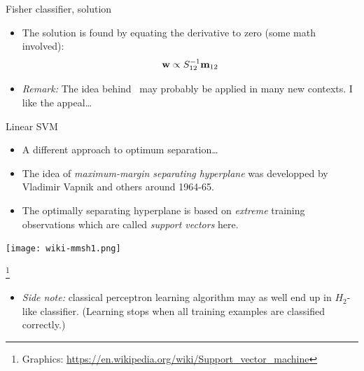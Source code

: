 \documentclass[handout]{beamer}   %
\def\S{S}
\def\b#1{{\bf #1}}
\newcommand\blfootnote[1]{%
  \begingroup
  \renewcommand\thefootnote{}\footnote{#1}%
  \addtocounter{footnote}{-1}%
  \endgroup
}
\newcommand\graphics[1]{%
  \blfootnote{\hbox{}\hskip-0.6cm Graphics: \url{#1}}%
}
\begin{document}
\begin{frame}{Fisher classifier, solution}
  \begin{itemize}
  \item The solution is found by equating the derivative to zero (some math involved):
    $$ \b w \propto \S_{12}^{-1}\b m_{12} $$

    \pause
  \item {\it Remark:\/} The idea behind \eqfisher\ may probably be applied
    in many new contexts. I like the appeal\/\dots
  \end{itemize}
  \vfill
  \vbox{}
\end{frame}


\begin{frame}{Linear SVM}
  \begin{minipage}[c]{5.7cm}
    \begin{itemize}[<+->]
    \item A different approach to optimum separation\/\ldots
    \item The idea of {\it maximum-margin separating hyperplane\/} was developped
      by Vladimir Vapnik and others around 1964-65.
    \item The optimally separating hyperplane is based on {\it extreme\/}
      training observations which are called {\it support vectors\/} here.
    \end{itemize}
  \end{minipage}
  \hfil
  \begin{minipage}[c]{4.8cm}
    \texttt{[image: wiki-mmsh1.png]}
  \end{minipage}
  \graphics{https://en.wikipedia.org/wiki/Support_vector_machine}%
  \pause

  \begin{itemize}
  \item {\it Side note:\/} classical perceptron learning algorithm may as well end up
    in $H_2$-like classifier. (Learning stops when all training examples are classified correctly.)
  \end{itemize}
\end{frame}
\end{document}
